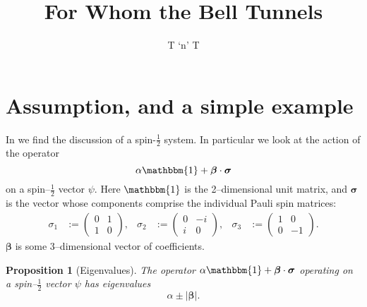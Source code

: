 \documentclass[12pt]{article}
\title{For Whom the Bell Tunnels}
\author{T `n' T}
\newtheorem{prop}[thm]{Proposition}
\begin{document}
\maketitle
\listoftodos

\bigskip

\section{Assumption, and a simple example}
In \cite[p.448]{Bell1966} we find the discussion of a spin-$\frac{1}{2}$ system. In particular we look at the action of the operator
\begin{displaymath}
  \alpha \mathbbm{1} + \bm{\beta} \cdot \bm{\sigma}
\end{displaymath}
on a spin--$\frac{1}{2}$ vector $\psi$. Here $\mathbbm{1}$ is the 2--dimensional unit matrix, and $\bm{\sigma}$ is the vector whose components comprise the individual Pauli spin matrices:
\begin{align*}
  \sigma_1 &:= \begin{pmatrix}
                 0 & 1 \\
                 1 & 0
               \end{pmatrix},
              &
  \sigma_2 &:= \begin{pmatrix}
                 0 & -i \\
                 i & 0
               \end{pmatrix},
              &
  \sigma_3 &:= \begin{pmatrix}
                 1 & 0 \\
                 0 & -1
               \end{pmatrix}.
\end{align*}
$\bm{\beta}$ is some 3--dimensional vector of coefficients.

\begin{prop}[Eigenvalues]
  The operator $\alpha \mathbbm{1} + \bm{\beta} \cdot \bm{\sigma}$ operating on a spin--$\frac{1}{2}$ vector $\psi$ has eigenvalues
  \begin{displaymath}
    \alpha \pm |\bm{\beta}|.
  \end{displaymath}
\end{prop}
\end{document}

